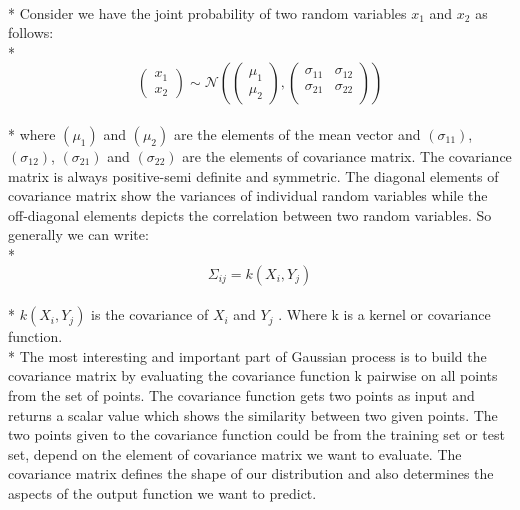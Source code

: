 \documentclass{article}
\begin{document}
\\*
Consider we have the joint probability of two random variables $x_1$ and $x_2$ as follows:
\\*
$$\begin{pmatrix}
x_1 \\
x_2
\end{pmatrix}
\sim \mathcal{N}{\left(
\begin{pmatrix}
\mu_1 \\
\mu_2
\end{pmatrix}
,
\begin{pmatrix}
\sigma_{11} & \sigma_{12}\\
\sigma_{21} & \sigma_{22}\\
\end{pmatrix}
\right)}$$
\\*
where $(\mu_1)$ and $(\mu_2)$ are the elements of the mean vector and $(\sigma_{11})$, $(\sigma_{12})$, $(\sigma_{21})$ and $(\sigma_{22})$ are the elements of covariance matrix. The covariance matrix is always positive-semi definite and symmetric. The diagonal elements of covariance matrix show the variances of individual random variables while the off-diagonal elements depicts the correlation between two random variables. So generally we can write:
\\*
$$\Sigma_{ij} = k(X_i,Y_j)$$
\\*
$k(X_i,Y_j)$ is the covariance of $X_i$ and $Y_j$ . Where k is a kernel or covariance function. 
\\*
The most interesting and important part of Gaussian process is to build the covariance matrix by evaluating the covariance function k pairwise on all points from the set of points. The covariance function gets two points as input and returns a scalar value which shows the similarity between two given points. The two points given to the covariance function could be from the training set or test set, depend on the element of covariance matrix we want to evaluate. The covariance matrix defines the shape of our distribution and also determines the aspects of the output function we want to predict. 
\end{document}
